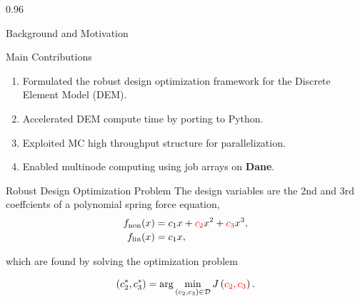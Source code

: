 \documentclass[final]{beamer}
\newlength{\colwidth}
\begin{document}
\begin{frame}[t]
\begin{columns}[t]
\begin{column}{0.96\colwidth}
\begin{block}{Background and Motivation}
\begin{itemize}
\end{itemize}
\end{block}
\begin{alertblock}{Main Contributions}
\begin{center}

\begin{enumerate}
    \item Formulated the robust design optimization framework for the Discrete Element Model (DEM).
    \item Accelerated DEM compute time by porting to Python.
    \item Exploited MC high throughput structure for parallelization.
    \item Enabled multinode computing using job arrays on \textbf{Dane}.
\end{enumerate}

\end{center}
\end{alertblock}

\vspace{-0.75cm}
\begin{block}{Robust Design Optimization Problem}
The design variables are the 2nd and 3rd coeffcients of a polynomial spring force equation,
\vspace{-0.5cm}
\begin{equation}\label{spring}
\begin{aligned}
f_{\mathrm{non}}(x)
    &= c_1x
    + \textcolor{red}{c_2}x^2+\textcolor{red}{c_3}x^3,
\\[-0.1em]
f_{\mathrm{lin}}(x)
    &= c_1x,
\end{aligned}
\end{equation}

\vspace{-0.5cm}
which are found by solving the optimization problem

\vspace{-1.25cm}

\begin{equation}\label{cost}
    (c_{2}^*, c_{3}^*) 
    = \arg\min_{(c_2,c_3)\in \mathcal{D}} J\left(\textcolor{red}{c_2, c_3}\right).
\end{equation}

\vspace{-0.75cm}


\end{block}
\end{column}
\end{columns}
\end{frame}
\end{document}
